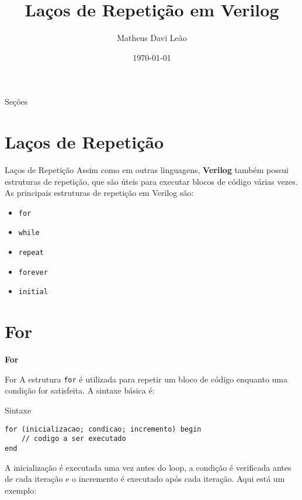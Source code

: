 \documentclass[aspectratio=169,xcolor=dvipsnames]{beamer}
\title{Laços de Repetição em Verilog}
\author{Matheus Davi Leão}
\institute{
    Poliware \\
    Escola Politécnica da Universidade de São Paulo
}
\date{\today}
\begin{document}
\begin{frame}
    \titlepage
\end{frame}

\begin{frame}{Seções}
    \tableofcontents
\end{frame}

\section{Laços de Repetição}

\begin{frame}{Laços de Repetição}
Assim como em outras linguagens, \textbf{Verilog} também possui estruturas de repetição, que são úteis para executar blocos de código várias vezes. As principais estruturas de repetição em Verilog são:

\begin{itemize}
  \item \texttt{for}
  \item \texttt{while}
  \item \texttt{repeat}
  \item \texttt{forever}
  \item \texttt{initial}
\end{itemize}
\end{frame}

\section{For}

\begin{frame}
    \Huge{\centerline{\textbf{For}}}
\end{frame}

\begin{frame}[fragile]{For}
A estrutura \texttt{for} é utilizada para repetir um bloco de código enquanto uma condição for satisfeita. A sintaxe básica é:

\begin{block}{Sintaxe}
\begin{verbatim}
for (inicializacao; condicao; incremento) begin
    // codigo a ser executado
end
\end{verbatim}
\end{block}

A inicialização é executada uma vez antes do loop, a condição é verificada antes de cada iteração e o incremento é executado após cada iteração. Aqui está um exemplo:
\end{frame}
\end{document}
